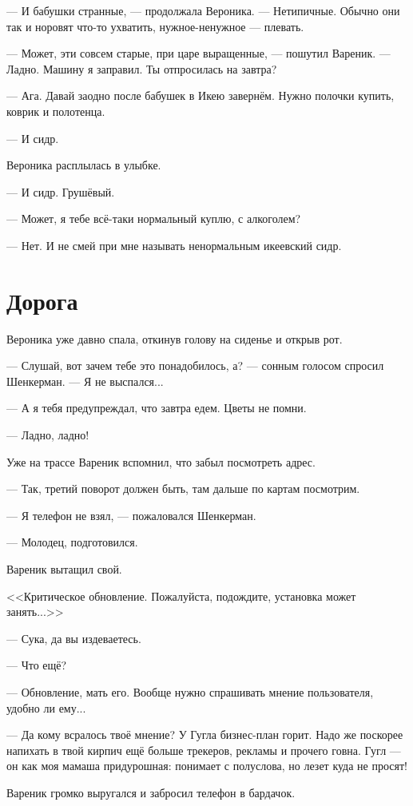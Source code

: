 \documentclass[a4paper,10pt,fleqn]{book}\usepackage{polyglossia}\setdefaultlanguage{english}\setotherlanguage{russian}\defaultfontfeatures{Ligatures=TeX,Mapping=tex-text} \usepackage{xcolor}\definecolor{lightgray}{HTML}{bbbbbb}\color{lightgray}\newcommand{\ml}[3]{\textcolor{black}{#3}}
\begin{document}
--- И бабушки странные, --- продолжала Вероника.
--- Нетипичные.
Обычно они так и норовят что-то ухватить, нужное-ненужное --- плевать.

--- Может, эти совсем старые, при царе выращенные, --- пошутил Вареник.
--- Ладно.
Машину я заправил.
Ты отпросилась на завтра?

--- Ага.
Давай заодно после бабушек в Икею завернём.
Нужно полочки купить, коврик и полотенца.

--- И сидр.

Вероника расплылась в улыбке.

--- И сидр.
Грушёвый.

--- Может, я тебе всё-таки нормальный куплю, с алкоголем?

--- Нет.
И не смей при мне называть ненормальным икеевский сидр.

\section{Дорога}

Вероника уже давно спала, откинув голову на сиденье и открыв рот.

--- Слушай, вот зачем тебе это понадобилось, а? --- сонным голосом спросил Шенкерман.
--- Я не выспался...

--- А я тебя предупреждал, что завтра едем.
Цветы не помни.

--- Ладно, ладно!

Уже на трассе Вареник вспомнил, что забыл посмотреть адрес.

--- Так, третий поворот должен быть, там дальше по картам посмотрим.

--- Я телефон не взял, --- пожаловался Шенкерман.

--- Молодец, подготовился.

Вареник вытащил свой.

<<Критическое обновление.
Пожалуйста, подождите, установка может занять...>>

--- Сука, да вы издеваетесь.

--- Что ещё?

--- Обновление, мать его.
Вообще нужно спрашивать мнение пользователя, удобно ли ему...

--- Да кому всралось твоё мнение?
У Гугла бизнес-план горит.
Надо же поскорее напихать в твой кирпич ещё больше трекеров, рекламы и прочего говна.
Гугл --- он как моя мамаша придурошная: понимает с полуслова, но лезет куда не просят!

Вареник громко выругался и забросил телефон в бардачок.
\end{document}
